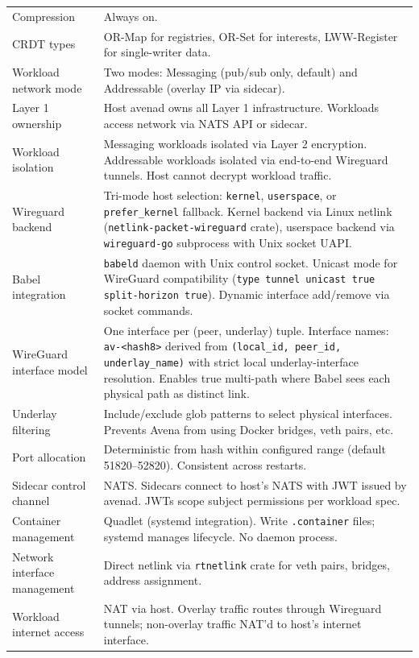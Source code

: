 \begin{longtable}{@{}p{4cm}p{9cm}@{}}
Compression & Always on. \\
CRDT types & OR-Map for registries, OR-Set for interests, LWW-Register for single-writer data. \\
Workload network mode & Two modes: Messaging (pub/sub only, default) and Addressable (overlay IP via sidecar). \\
Layer 1 ownership & Host avenad owns all Layer 1 infrastructure. Workloads access network via NATS API or sidecar. \\
Workload isolation & Messaging workloads isolated via Layer 2 encryption. Addressable workloads isolated via end-to-end Wireguard tunnels. Host cannot decrypt workload traffic. \\
Wireguard backend & Tri-mode host selection: \texttt{kernel}, \texttt{userspace}, or \texttt{prefer\_kernel} fallback. Kernel backend via Linux netlink (\texttt{netlink-packet-wireguard} crate), userspace backend via \texttt{wireguard-go} subprocess with Unix socket UAPI. \\
Babel integration & \texttt{babeld} daemon with Unix control socket. Unicast mode for WireGuard compatibility (\texttt{type tunnel unicast true split-horizon true}). Dynamic interface add/remove via socket commands. \\
WireGuard interface model & One interface per (peer, underlay) tuple. Interface names: \texttt{av-<hash8>} derived from \texttt{(local\_id, peer\_id, underlay\_name)} with strict local underlay-interface resolution. Enables true multi-path where Babel sees each physical path as distinct link. \\
Underlay filtering & Include/exclude glob patterns to select physical interfaces. Prevents Avena from using Docker bridges, veth pairs, etc. \\
Port allocation & Deterministic from hash within configured range (default 51820--52820). Consistent across restarts. \\
Sidecar control channel & NATS. Sidecars connect to host's NATS with JWT issued by avenad. JWTs scope subject permissions per workload spec. \\
Container management & Quadlet (systemd integration). Write \texttt{.container} files; systemd manages lifecycle. No daemon process. \\
Network interface management & Direct netlink via \texttt{rtnetlink} crate for veth pairs, bridges, address assignment. \\
Workload internet access & NAT via host. Overlay traffic routes through Wireguard tunnels; non-overlay traffic NAT'd to host's internet interface. \\
\bottomrule
\end{longtable}


